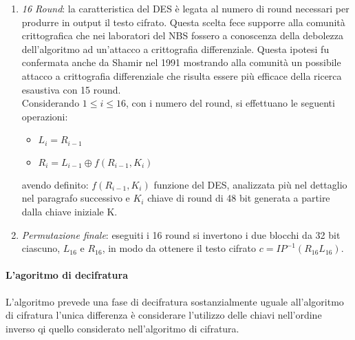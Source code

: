 \documentclass[11pt, a4paper, oneside]{Thesis} %
\begin{document}
\begin{enumerate}
 \item \textit{16 Round}: la caratteristica del DES è legata al numero di round necessari per produrre in output il testo cifrato. Questa scelta fece supporre alla comunità crittografica
 che nei laboratori del NBS fossero a conoscenza della debolezza dell'algoritmo ad un'attacco a crittografia differenziale. Questa ipotesi fu confermata anche da Shamir nel 1991 mostrando
 alla comunità un possibile attacco a crittografia differenziale che risulta essere più efficace della ricerca esaustiva con 15 round.
 \\Considerando $1\le i \le 16$, con i numero del round, 
 si effettuano le seguenti operazioni:
 \begin{itemize}
  \item $ L_i = R_{i-1} $
  \item $ R_i = L_{i-1} \oplus f(R_{i-1}, K_i) $
 \end{itemize}
 avendo definito: $f(R_{i-1}, K_i) $ funzione del DES, analizzata più nel dettaglio nel paragrafo successivo e $K_i$ chiave di round di 48 bit generata a partire dalla chiave iniziale K.
 \item \textit{Permutazione finale}: eseguiti i 16 round si invertono i due blocchi da 32 bit ciascuno, $L_{16}$ e $R_{16}$, in modo da ottenere il testo cifrato $c=IP^{-1}(R_{16}L_{16})$.
\end{enumerate}

\paragraph{L'agoritmo di decifratura}
L'algoritmo prevede una fase di decifratura sostanzialmente uguale all'algoritmo di cifratura l'unica differenza è considerare l'utilizzo delle chiavi nell'ordine inverso qi quello considerato 
nell'algoritmo di cifratura.
\end{document}
